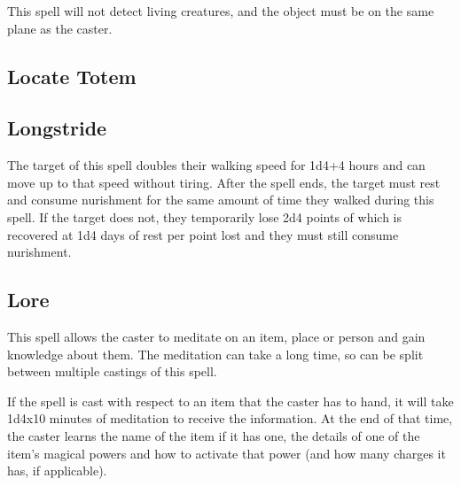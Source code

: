 \begin{multicols*}{2}
This spell will not detect living creatures, and the object must be on the same plane as the caster.

\subsection{Locate Totem}\label{spell:Locate Totem}



\subsection{Longstride}\label{spell:Longstride}

The target of this spell doubles their walking speed for 1d4+4 hours and can move up to that speed without tiring. After the spell ends, the target must rest and consume nurishment for the same amount of time they walked during this spell. If the target does not, they temporarily lose 2d4 points of  which is recovered at 1d4 days of rest per point lost and they must still consume nurishment.

\subsection{Lore}\label{spell:Lore}

This spell allows the caster to meditate on an item, place or person and gain knowledge about them. The meditation can take a long time, so can be split between multiple castings of this spell.

If the spell is cast with respect to an item that the caster has to hand, it will take 1d4x10 minutes of meditation to receive the information. At the end of that time, the caster learns the name of the item if it has one, the details of one of the item’s magical powers and how to activate that power (and how many charges it has, if applicable).


\end{multicols*}
